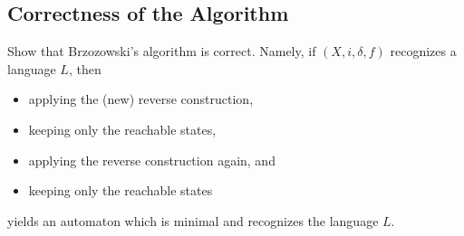 \documentclass[main.tex]{subfiles}
\begin{document}
\subsection{Correctness of the Algorithm}
\begin{exer}[1pt]
    Show that Brzozowski's algorithm is correct. Namely, if $(X,i, \delta, f)$ recognizes a language $L$, then
    \begin{itemize}
        \item applying the (new) reverse construction, 
        \item keeping only the reachable states,
        \item applying the reverse construction again, and
        \item keeping only the reachable states
    \end{itemize}
    yields an automaton which is minimal and recognizes the language $L$.
\end{exer}
\end{document}
